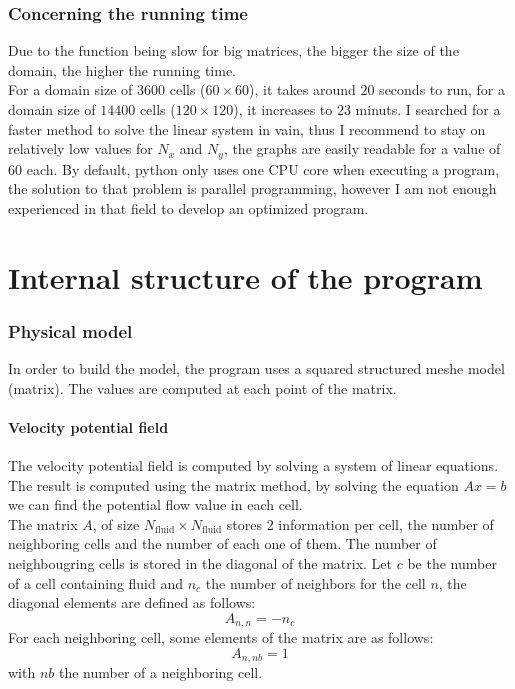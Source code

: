 \section{Concerning the running time}
Due to the function  being slow for
big matrices, the bigger the size of the domain, the higher the running time.\\
For a domain size of $\num{3600}$ cells ($\num{60} \times \num{60}$), it takes
around $\num{20}$ seconds to run, for a domain size of $\num{14400}$ cells
($\num{120} \times \num{120}$), it increases to $\num{23}$ minuts. 
\smallbreak{}
I searched for a faster method to solve the linear system in vain, thus I
recommend to stay on relatively low values for $N_x$ and $N_y$, the graphs are
easily readable for a value of $\num{60}$ each.
\smallbreak{}
By default, python only uses one CPU core when executing a program, the
solution to that problem is parallel programming, however I am not enough
experienced in that field to develop an optimized program.

\part{Internal structure of the program}
\section{Physical model}
In order to build the model, the program uses a squared structured meshe
model (matrix). The values are computed at each point of the matrix.

\subsection{Velocity potential field}
The velocity potential field is computed by solving a system of linear
equations. The result is computed using the matrix method, by solving the
equation $Ax = b$ we can find the potential flow value in each cell.\\
The matrix $A$, of size $N_\text{fluid} \times N_\text{fluid}$ stores 2
information per cell, the number of neighboring cells and the number of each
one of them. The number of neighbougring cells is stored in the diagonal of the
 matrix. Let $c$ be the number of a cell containing fluid and $n_c$ the number
 of neighbors for the cell $n$, the diagonal elements are defined as follows:
\[
      A_{n, n} = -n_c
\]
For each neighboring cell, some elements of the matrix are as follows:
\[
      A_{n, nb} = 1
\]
with $nb$ the number of a neighboring cell.\\

